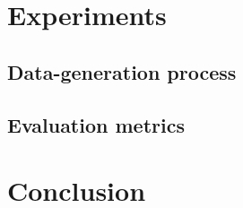 \documentclass{article}
\begin{document}
\section{Experiments}\label{subsec:Experiments}

\subsection{Data-generation process}

\subsection{Evaluation metrics}


\section{Conclusion}\label{subsec:Conclusion}

\cite{mahajan_zero-shot_2024}



\end{document}
